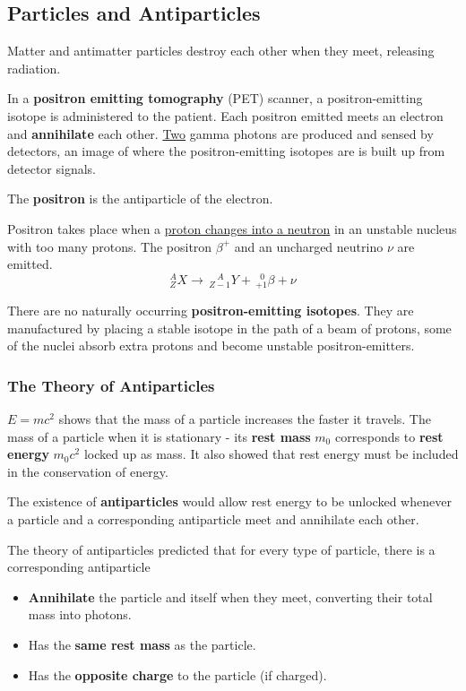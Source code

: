 \subsection{Particles and Antiparticles}

Matter and antimatter particles destroy each other when they meet, releasing radiation.

In a \textbf{positron emitting tomography} (PET) scanner, a positron-emitting isotope is administered to the patient. Each positron emitted meets an electron and \textbf{annihilate} each other. \underline{Two} gamma photons are produced and sensed by detectors, an image of where the positron-emitting isotopes are is built up from detector signals.

The \textbf{positron} is the antiparticle of the electron.

Positron takes place when a \underline{proton changes into a neutron} in an unstable nucleus with too many protons. The positron $\beta^+$ and an uncharged neutrino $\nu$ are emitted.
$$^A_ZX\to\,^{\hspace{11pt}A}_{Z-1}Y+\,^{\hspace{6pt}0}_{+1}\beta+\nu$$

There are no naturally occurring \textbf{positron-emitting isotopes}. They are manufactured by placing a stable isotope in the path of a beam of protons, some of the nuclei absorb extra protons and become unstable positron-emitters.

\subsubsection*{The Theory of Antiparticles}

$E=mc^2$ shows that the mass of a particle increases the faster it travels. The mass of a particle when it is stationary - its \textbf{rest mass} $m_0$ corresponds to \textbf{rest energy} $m_0c^2$ locked up as mass. It also showed that rest energy must be included in the conservation of energy.

The existence of \textbf{antiparticles} would allow rest energy to be unlocked whenever a particle and a corresponding antiparticle meet and annihilate each other.

The theory of antiparticles predicted that for every type of particle, there is a corresponding antiparticle
\begin{itemize}
    \item \textbf{Annihilate} the particle and itself when they meet, converting their total mass into photons.
    \item Has the \textbf{same rest mass} as the particle.
    \item Has the \textbf{opposite charge} to the particle (if charged).
\end{itemize}

